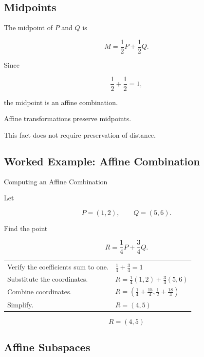 \subsection{Midpoints}
\label{subsec:affine-midpoints}

The midpoint of \(P\) and \(Q\) is

\[
\boxed{
M=\frac12P+\frac12Q.
}
\]

Since

\[ \frac12+\frac12=1, \]

the midpoint is an affine combination.

Affine transformations preserve midpoints.

This fact does not require preservation of distance.

\subsection{Worked Example: Affine Combination}
\label{subsec:worked-affine-combination}

\begin{workedexamplebox}{Computing an Affine Combination}

Let

\[ P=(1,2),\qquad Q=(5,6). \]

Find the point

\[ R=\frac14P+\frac34Q. \]

\begin{tabularx}{\textwidth}{@{}>{\raggedright\arraybackslash}p{}X@{}}
Verify the coefficients sum to one. &
\(\frac14+\frac34=1\)\\
Substitute the coordinates. &
\(R=\frac14(1,2)+\frac34(5,6)\)\\
Combine coordinates. &
\(R=\left(\frac14+\frac{15}{4},\frac12+\frac{18}{4}\right)\)\\
Simplify. &
\(R=(4,5)\)
\end{tabularx}

\begin{answerbox}
\[ \boxed{R=(4,5)} \]
\end{answerbox}
\end{workedexamplebox}

\subsection{Affine Subspaces}
\label{subsec:affine-subspaces}

